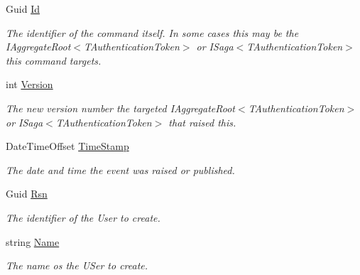 \begin{DoxyCompactItemize}
Guid \hyperlink{classCqrs_1_1WebApi_1_1HelpPageConfig_1_1UserCreatedEvent_a4b16a2634b2d298f5cca25ab9ca40d32_a4b16a2634b2d298f5cca25ab9ca40d32}{Id}
\begin{DoxyCompactList}\small\item\em The identifier of the command itself. In some cases this may be the I\+Aggregate\+Root$<$\+T\+Authentication\+Token$>$ or I\+Saga$<$\+T\+Authentication\+Token$>$ this command targets. \end{DoxyCompactList}\item 
int \hyperlink{classCqrs_1_1WebApi_1_1HelpPageConfig_1_1UserCreatedEvent_ac58e3523e24fb4c936146839e4a717a9_ac58e3523e24fb4c936146839e4a717a9}{Version}
\begin{DoxyCompactList}\small\item\em The new version number the targeted I\+Aggregate\+Root$<$\+T\+Authentication\+Token$>$ or I\+Saga$<$\+T\+Authentication\+Token$>$ that raised this. \end{DoxyCompactList}\item 
Date\+Time\+Offset \hyperlink{classCqrs_1_1WebApi_1_1HelpPageConfig_1_1UserCreatedEvent_a413c824200dd34f9a0329641fbea731d_a413c824200dd34f9a0329641fbea731d}{Time\+Stamp}
\begin{DoxyCompactList}\small\item\em The date and time the event was raised or published. \end{DoxyCompactList}\item 
Guid \hyperlink{classCqrs_1_1WebApi_1_1HelpPageConfig_1_1UserCreatedEvent_a8bf0fee0f939dfcdc81f402ba0e07c22_a8bf0fee0f939dfcdc81f402ba0e07c22}{Rsn}
\begin{DoxyCompactList}\small\item\em The identifier of the User to create. \end{DoxyCompactList}\item 
string \hyperlink{classCqrs_1_1WebApi_1_1HelpPageConfig_1_1UserCreatedEvent_a528ebdf311a769ae18fea4e8a155998f_a528ebdf311a769ae18fea4e8a155998f}{Name}
\begin{DoxyCompactList}\small\item\em The name os the U\+Ser to create. \end{DoxyCompactList}\item 

\end{DoxyCompactItemize}
